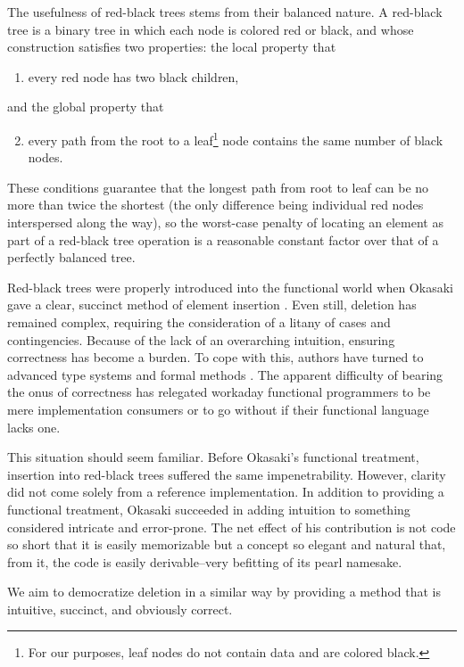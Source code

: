 \documentclass[preprint]{sigplanconf}
\begin{document}
The usefulness of red-black trees stems from their balanced nature. A red-black tree is a binary tree in which each node is colored red or black, and whose construction satisfies two properties: the local property that
\begin{enumerate}
\item every red node has two black children,
\end{enumerate}
and the global property that
\begin{enumerate}
\setcounter{enumi}{1}
\item every path from the root to a leaf\footnote{For our purposes, leaf nodes do not contain data and are colored black.} node contains the same number of black nodes.
\end{enumerate}
These conditions guarantee that the longest path from root to leaf can be no more than twice the shortest (the only difference being individual red nodes interspersed along the way), so the worst-case penalty of locating an element as part of a red-black tree operation is a reasonable constant factor over that of a perfectly balanced tree.

Red-black trees were properly introduced into the functional world when Okasaki gave a clear, succinct method of element insertion \cite{okasaki1999functional}. Even still, deletion has remained complex, requiring the consideration of a litany of cases and contingencies. Because of the lack of an overarching intuition, ensuring correctness has become a burden. To cope with this, authors have turned to advanced type systems \cite{kahrs2001red} and formal methods \cite{appel2011efficient}. The apparent difficulty of bearing the onus of correctness has relegated workaday functional programmers to be mere implementation consumers or to go without if their functional language lacks one.

This situation should seem familiar. Before Okasaki's functional treatment, insertion into red-black trees suffered the same impenetrability. However, clarity did not come solely from a reference implementation. In addition to providing a functional treatment, Okasaki succeeded in adding intuition to something considered intricate and error-prone. The net effect of his contribution is not code so short that it is easily memorizable but a concept so elegant and natural that, from it, the code is easily derivable--very befitting of its pearl namesake.

We aim to democratize deletion in a similar way by providing a method that is intuitive, succinct, and obviously correct.
\end{document}
